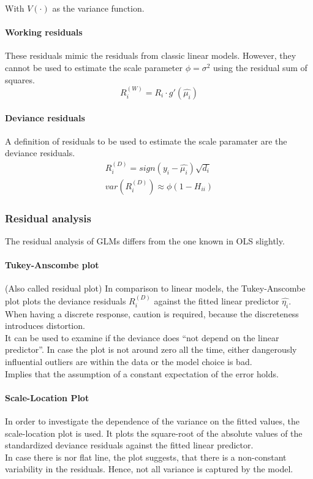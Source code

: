 With $V(\cdot)$ as the variance function.

\paragraph{Working residuals}
These residuals mimic the residuals from classic linear models. However, they cannot be used to estimate the scale parameter $\phi = \sigma^2$ using the residual sum of squares. 
\begin{equation*}
R_i^{(W)} = R_i\cdot g'(\hat{\mu_i})
\end{equation*}

\paragraph{Deviance residuals}
A definition of residuals to be used to estimate the scale paramater are the deviance residuals.
\begin{gather*}
R_i^{(D)} = sign(y_i - \hat{\mu_i})\sqrt{d_i} \\
var\left(R_i^{(D)}\right)\approx \phi(1-H_{ii})
\end{gather*}

\subsubsection{Residual analysis}
The residual analysis of GLMs differs from the one known in OLS slightly.

\paragraph{Tukey-Anscombe plot}
(Also called residual plot) In comparison to linear models, the Tukey-Anscombe plot plots the deviance residuals $R_i^{(D)}$ against the fitted linear predictor $\hat{\eta_i}$. When having a discrete response, caution is required, because the discreteness introduces distortion.\\
It can be used to examine if the deviance does ``not depend on the linear predictor''. In case the plot is not around zero all the time, either dangerously influential outliers are within the data or the model choice is bad.\\
Implies that the assumption of a constant expectation of the error holds.

\paragraph{Scale-Location Plot}
In order to investigate the dependence of the variance on the fitted values, the scale-location plot is used. It plots the square-root of the absolute values of the standardized deviance residuals against the fitted linear predictor.\\
In case there is nor flat line, the plot suggests, that there is a non-constant variability in the residuals. Hence, not all variance is captured by the model.


